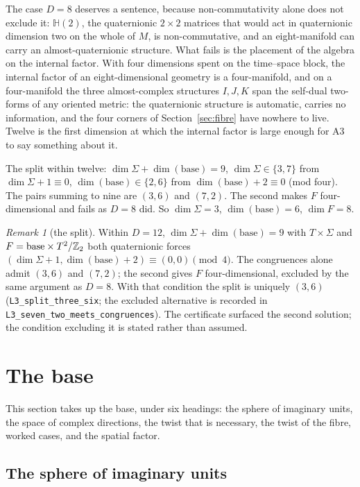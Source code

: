 \documentclass[11pt,a4paper]{article}
\theoremstyle{plain}
\theoremstyle{definition}
\theoremstyle{remark}
\newtheorem{remark}[theorem]{Remark}
\newcommand{\Hquat}{\mathbb{H}}
\begin{document}
The case $D=8$ deserves a sentence, because non-commutativity alone does not exclude it: $\Hquat(2)$, the quaternionic $2\times2$ matrices that would act in quaternionic dimension two on the whole of $M$, is non-commutative, and an eight-manifold can carry an almost-quaternionic structure. What fails is the placement of the algebra on the internal factor. With four dimensions spent on the time--space block, the internal factor of an eight-dimensional geometry is a four-manifold, and on a four-manifold the three almost-complex structures $I,J,K$ span the self-dual two-forms of any oriented metric: the quaternionic structure is automatic, carries no information, and the four corners of Section~\ref{sec:fibre} have nowhere to live. Twelve is the first dimension at which the internal factor is large enough for A3 to say something about it.

The split within twelve: $\dim\Sigma+\dim(\text{base})=9$, $\dim\Sigma\in\{3,7\}$ from $\dim\Sigma+1\equiv0$, $\dim(\text{base})\in\{2,6\}$ from $\dim(\text{base})+2\equiv0$ (mod four). The pairs summing to nine are $(3,6)$ and $(7,2)$. The second makes $F$ four-dimensional and fails as $D=8$ did. So $\dim\Sigma=3$, $\dim(\text{base})=6$, $\dim F=8$.

\begin{remark}[the split]\label{rem:split}
Within $D=12$, $\dim\Sigma+\dim(\text{base})=9$ with $T\times\Sigma$ and $F=\text{base}\times T^2/\mathbb{Z}_2$ both quaternionic forces $(\dim\Sigma+1,\dim(\text{base})+2)\equiv(0,0)\pmod 4$. The congruences alone admit $(3,6)$ and $(7,2)$; the second gives $F$ four-dimensional, excluded by the same argument as $D=8$. With that condition the split is uniquely $(3,6)$ (\texttt{L3\_split\_three\_six}; the excluded alternative is recorded in \texttt{L3\_seven\_two\_meets\_congruences}). The certificate surfaced the second solution; the condition excluding it is stated rather than assumed.
\end{remark}

\section{The base}\label{sec:base}

This section takes up the base, under six headings: the sphere of imaginary units, the space of complex directions, the twist that is necessary, the twist of the fibre, worked cases, and the spatial factor.

\subsection{The sphere of imaginary units}
\end{document}
